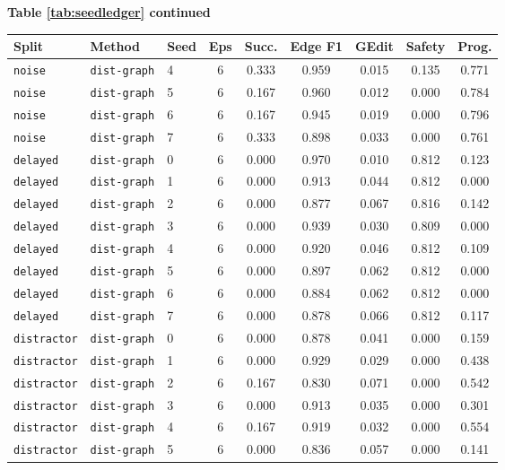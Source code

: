 \documentclass{article}
\begin{document}
\begin{center}
\textbf{Table \ref{tab:seedledger} continued}\\[0.4ex]
\begin{tabular}{lllcccccc}
\toprule
Split & Method & Seed & Eps & Succ. & Edge F1 & GEdit & Safety & Prog. \\
\midrule
\texttt{noise} & \texttt{dist-graph} & 4 & 6 & 0.333 & 0.959 & 0.015 & 0.135 & 0.771 \\
\texttt{noise} & \texttt{dist-graph} & 5 & 6 & 0.167 & 0.960 & 0.012 & 0.000 & 0.784 \\
\texttt{noise} & \texttt{dist-graph} & 6 & 6 & 0.167 & 0.945 & 0.019 & 0.000 & 0.796 \\
\texttt{noise} & \texttt{dist-graph} & 7 & 6 & 0.333 & 0.898 & 0.033 & 0.000 & 0.761 \\
\texttt{delayed} & \texttt{dist-graph} & 0 & 6 & 0.000 & 0.970 & 0.010 & 0.812 & 0.123 \\
\texttt{delayed} & \texttt{dist-graph} & 1 & 6 & 0.000 & 0.913 & 0.044 & 0.812 & 0.000 \\
\texttt{delayed} & \texttt{dist-graph} & 2 & 6 & 0.000 & 0.877 & 0.067 & 0.816 & 0.142 \\
\texttt{delayed} & \texttt{dist-graph} & 3 & 6 & 0.000 & 0.939 & 0.030 & 0.809 & 0.000 \\
\texttt{delayed} & \texttt{dist-graph} & 4 & 6 & 0.000 & 0.920 & 0.046 & 0.812 & 0.109 \\
\texttt{delayed} & \texttt{dist-graph} & 5 & 6 & 0.000 & 0.897 & 0.062 & 0.812 & 0.000 \\
\texttt{delayed} & \texttt{dist-graph} & 6 & 6 & 0.000 & 0.884 & 0.062 & 0.812 & 0.000 \\
\texttt{delayed} & \texttt{dist-graph} & 7 & 6 & 0.000 & 0.878 & 0.066 & 0.812 & 0.117 \\
\texttt{distractor} & \texttt{dist-graph} & 0 & 6 & 0.000 & 0.878 & 0.041 & 0.000 & 0.159 \\
\texttt{distractor} & \texttt{dist-graph} & 1 & 6 & 0.000 & 0.929 & 0.029 & 0.000 & 0.438 \\
\texttt{distractor} & \texttt{dist-graph} & 2 & 6 & 0.167 & 0.830 & 0.071 & 0.000 & 0.542 \\
\texttt{distractor} & \texttt{dist-graph} & 3 & 6 & 0.000 & 0.913 & 0.035 & 0.000 & 0.301 \\
\texttt{distractor} & \texttt{dist-graph} & 4 & 6 & 0.167 & 0.919 & 0.032 & 0.000 & 0.554 \\
\texttt{distractor} & \texttt{dist-graph} & 5 & 6 & 0.000 & 0.836 & 0.057 & 0.000 & 0.141 \\

\end{tabular}
\end{center}
\end{document}
